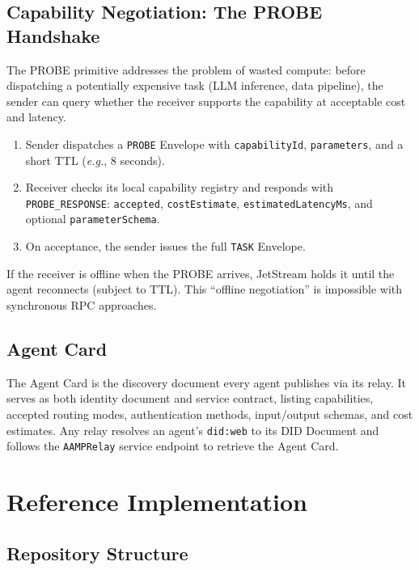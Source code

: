 \documentclass[11pt,a4paper]{article}
\begin{document}
\subsection{Capability Negotiation: The PROBE Handshake}
\label{sec:probe}

The PROBE primitive addresses the problem of wasted compute: before dispatching a
potentially expensive task (LLM inference, data pipeline), the sender can query
whether the receiver supports the capability at acceptable cost and latency.

\begin{enumerate}[leftmargin=*]
  \item Sender dispatches a \texttt{PROBE} Envelope with \texttt{capabilityId},
    \texttt{parameters}, and a short TTL (\emph{e.g.}, 8 seconds).
  \item Receiver checks its local capability registry and responds with
    \texttt{PROBE\_RESPONSE}: \texttt{accepted}, \texttt{costEstimate},
    \texttt{estimatedLatencyMs}, and optional \texttt{parameterSchema}.
  \item On acceptance, the sender issues the full \texttt{TASK} Envelope.
\end{enumerate}

If the receiver is offline when the PROBE arrives, JetStream holds it until the
agent reconnects (subject to TTL). This ``offline negotiation'' is impossible with
synchronous RPC approaches.

\subsection{Agent Card}
\label{sec:agentcard}

The Agent Card is the discovery document every agent publishes via its relay. It
serves as both identity document and service contract, listing capabilities,
accepted routing modes, authentication methods, input/output schemas, and cost
estimates. Any relay resolves an agent's \texttt{did:web} to its DID Document and
follows the \texttt{AAMPRelay} service endpoint to retrieve the Agent Card.

\section{Reference Implementation}
\label{sec:impl}

\subsection{Repository Structure}
\end{document}
